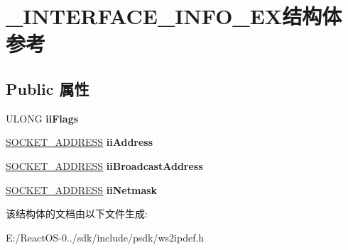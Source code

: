 \hypertarget{struct___i_n_t_e_r_f_a_c_e___i_n_f_o___e_x}{}\section{\+\_\+\+I\+N\+T\+E\+R\+F\+A\+C\+E\+\_\+\+I\+N\+F\+O\+\_\+\+E\+X结构体 参考}
\label{struct___i_n_t_e_r_f_a_c_e___i_n_f_o___e_x}
\subsection*{Public 属性}
\begin{DoxyCompactItemize}
\item 
\mbox{\label{struct___i_n_t_e_r_f_a_c_e___i_n_f_o___e_x_a9a5488d38344e0d0160eb0e936849d3f}} 
U\+L\+O\+NG {\bfseries ii\+Flags}
\item 
\mbox{\label{struct___i_n_t_e_r_f_a_c_e___i_n_f_o___e_x_af6a7af93badcbb421d568d072591474c}} 
\hyperlink{struct___s_o_c_k_e_t___a_d_d_r_e_s_s}{S\+O\+C\+K\+E\+T\+\_\+\+A\+D\+D\+R\+E\+SS} {\bfseries ii\+Address}
\item 
\mbox{\label{struct___i_n_t_e_r_f_a_c_e___i_n_f_o___e_x_acd06e7b1208066f44748b55826bab97e}} 
\hyperlink{struct___s_o_c_k_e_t___a_d_d_r_e_s_s}{S\+O\+C\+K\+E\+T\+\_\+\+A\+D\+D\+R\+E\+SS} {\bfseries ii\+Broadcast\+Address}
\item 
\mbox{\label{struct___i_n_t_e_r_f_a_c_e___i_n_f_o___e_x_ad5dd90a3f79e82609f2fe4a4ed49052f}} 
\hyperlink{struct___s_o_c_k_e_t___a_d_d_r_e_s_s}{S\+O\+C\+K\+E\+T\+\_\+\+A\+D\+D\+R\+E\+SS} {\bfseries ii\+Netmask}
\end{DoxyCompactItemize}


该结构体的文档由以下文件生成\+:\begin{DoxyCompactItemize}
\item 
E\+:/\+React\+O\+S-\/0../sdk/include/psdk/ws2ipdef.\+h\end{DoxyCompactItemize}
